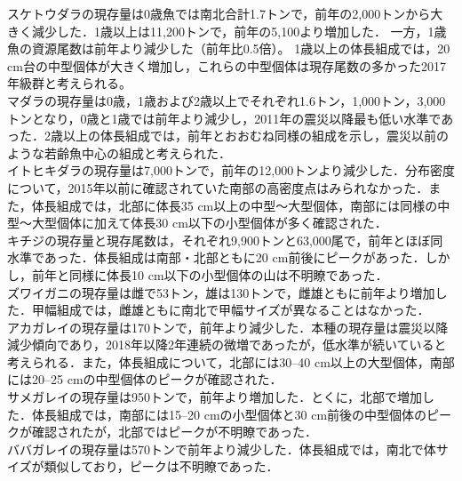 \documentclass[12pt]{article}
\begin{document}
スケトウダラの現存量は0歳魚では南北合計1.7トンで，前年の2,000トンから大きく減少した．1歳以上は11,200トンで，前年の5,100より増加した．
一方，1歳魚の資源尾数は前年より減少した（前年比0.5倍）。
1歳以上の体長組成では，20 cm台の中型個体が大きく増加し，これらの中型個体は現存尾数の多かった2017年級群と考えられる。
\ \\
マダラの現存量は0歳，1歳および2歳以上でそれぞれ1.6トン，1,000トン，3,000トンとなり，0歳と1歳では前年より減少し，2011年の震災以降最も低い水準であった．2歳以上の体長組成では，前年とおおむね同様の組成を示し，震災以前のような若齢魚中心の組成と考えられた．
\ \\
イトヒキダラの現存量は7,000トンで，前年の12,000トンより減少した．分布密度について，2015年以前に確認されていた南部の高密度点はみられなかった．また，体長組成では，北部に体長35 cm以上の中型～大型個体，南部には同様の中型～大型個体に加えて体長30 cm以下の小型個体が多く確認された．
\ \\
キチジの現存量と現存尾数は，それぞれ9,900トンと63,000尾で，前年とほぼ同水準であった．体長組成は南部・北部ともに20 cm前後にピークがあった．しかし，前年と同様に体長10 cm以下の小型個体の山は不明瞭であった．
\ \\
ズワイガニの現存量は雌で53トン，雄は130トンで，雌雄ともに前年より増加した．甲幅組成では，雌雄ともに南北で甲幅サイズが異なることはなかった．
\ \\
アカガレイの現存量は170トンで，前年より減少した．本種の現存量は震災以降減少傾向であり，2018年以降2年連続の微増であったが，低水準が続いていると考えられる．また，体長組成について，北部には30–40 cm以上の大型個体，南部には20–25 cmの中型個体のピークが確認された．
\ \\
サメガレイの現存量は950トンで，前年より増加した．とくに，北部で増加した．体長組成では，南部には15–20 cmの小型個体と30 cm前後の中型個体のピークが確認されたが，北部ではピークが不明瞭であった．
\ \\
ババガレイの現存量は570トンで前年より減少した．体長組成では，南北で体サイズが類似しており，ピークは不明瞭であった．
\end{document}
